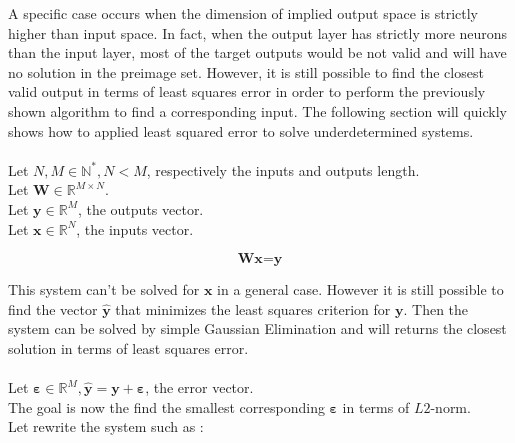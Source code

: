 \documentclass{article}
\begin{document}
A specific case occurs when the dimension of implied output space is strictly higher than input space. 
In fact, when the output layer has strictly more neurons than the input layer, most of the target outputs would be not valid 
and will have no solution in the preimage set. However, it is still possible to find the closest valid output in terms of least squares error
in order to perform the previously shown algorithm to find a corresponding input. The following section will quickly shows how to applied
least squared error to solve underdetermined systems. \\\\
Let $N,M \in \mathbb{N^{*}},N<M$, respectively the inputs and outputs length.\\
Let $\textbf{W}\in \mathbb{R}^{M \times N}$.\\
Let $\textbf{y} \in \mathbb{R}^{M}$, the outputs vector.\\
Let $\textbf{x} \in \mathbb{R}^{N}$, the inputs vector.

\begin{equation*}
    \textbf{Wx}= \textbf{y}
\end{equation*}

This system can't be solved for $\textbf{x}$ in a general case. However it is still possible to find the vector $\widehat{\textbf{y}}$ that minimizes
the least squares criterion for $\textbf{y}$. Then the system can be solved by simple Gaussian Elimination and will returns the closest solution in terms
of least squares error.\\\\
Let $\boldsymbol{\varepsilon} \in \mathbb{R}^{M}, \widehat{\textbf{y}} = \textbf{y}+ \boldsymbol{\varepsilon}$, the error vector.\\
The goal is now the find the smallest corresponding $\boldsymbol{\varepsilon}$ in terms of $L2$-norm.\\
Let rewrite the system such as :
\end{document}
